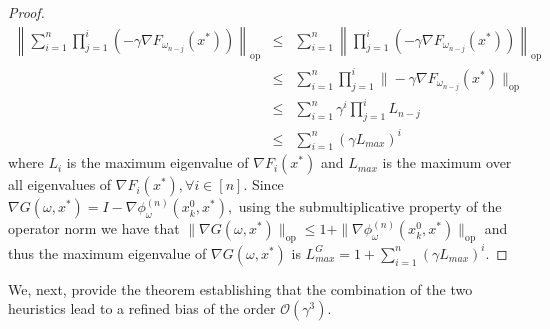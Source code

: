 \begin{proof}
    \begin{eqnarray}
        \left\|\sum\limits_{i=1}^{n} \prod\limits_{j=1}^{i} (-\gamma \nabla F_{\omega_{n-j}}(x^*))\right\|_{\text{op}} &\leq& \sum\limits_{i=1}^{n}\left\|\prod\limits_{j=1}^{i} (-\gamma \nabla F_{\omega_{n-j}}(x^*))\right\|_{\text{op}} \nonumber \\
        &\leq& \sum\limits_{i=1}^{n}\prod\limits_{j=1}^{i} \|-\gamma \nabla F_{\omega_{n-j}}(x^*)\|_{\text{op}} \nonumber \\
        &\leq& \sum\limits_{i=1}^{n}\gamma^i \prod\limits_{j=1}^{i}  L_{n-j} \\
        &\leq& \sum\limits_{i=1}^{n} (\gamma L_{max})^i
    \end{eqnarray}
    where $L_i$ is the maximum eigenvalue of $\nabla F_i(x^*)$ and $L_{max}$ is the maximum over all eigenvalues of $\nabla F_i(x^*), \forall i\in[n]$. 
    Since $\nabla G({\omega},x^*) = I - \nabla \phi^{(n)}_{\omega}(x_k^0, x^*),$ using the submultiplicative property of the operator norm we have that 
    $\|\nabla G(\omega,x^*)\|_{\text{op}} 
    \leq 1 + 
    \|\nabla \phi^{(n)}_{\omega}(x_k^0, x^*)\|_{\text{op}}$ and thus the maximum eigenvalue of 
    $\nabla G(\omega,x^*)$ is $L_{max}^{G} = 1 + \sum\limits_{i=1}^{n} (\gamma L_{max})^i$.
\end{proof}

We, next, provide the theorem establishing that the combination of the two heuristics lead to a refined bias of the order $\mathcal{O}\left(\gamma^3\right)$. 
